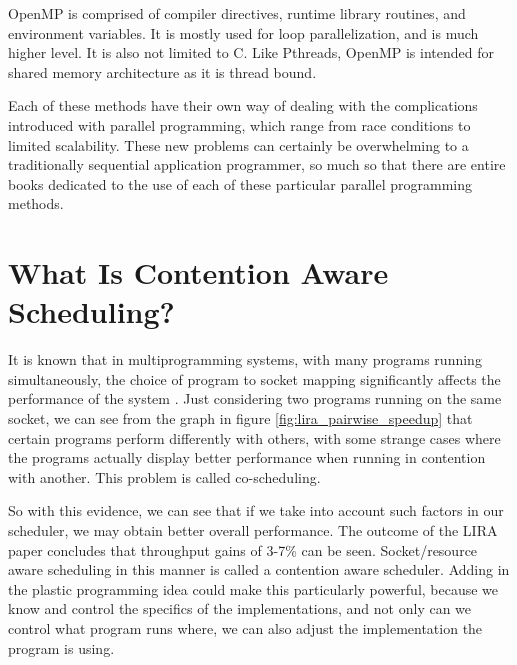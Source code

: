 OpenMP is comprised of compiler directives, runtime library routines, and environment variables. It is mostly used for loop parallelization, and is much higher level. It is also not limited to C. Like Pthreads, OpenMP is intended for shared memory architecture as it is thread bound.

Each of these methods have their own way of dealing with the complications introduced with parallel programming, which range from race conditions to limited scalability. These new problems can certainly be overwhelming to a traditionally sequential application programmer, so much so that there are entire books dedicated to the use of each of these particular parallel programming methods. 



\section{What Is Contention Aware Scheduling?}

It is known that in multiprogramming systems, with many programs running simultaneously, the choice of program to socket mapping significantly affects the performance of the system \cite{lira}. Just considering two programs running on the same socket, we can see from the graph in figure \ref{fig:lira_pairwise_speedup} that certain programs perform differently with others, with some strange cases where the programs actually display better performance when running in contention with another. This problem is called co-scheduling.

So with this evidence, we can see that if we take into account such factors in our scheduler, we may obtain better overall performance. The outcome of the LIRA paper concludes that throughput gains of 3-7\% can be seen. Socket/resource aware scheduling in this manner is called a contention aware scheduler. Adding in the plastic programming idea could make this particularly powerful, because we know and control the specifics of the implementations, and not only can we control what program runs where, we can also adjust the implementation the program is using.

